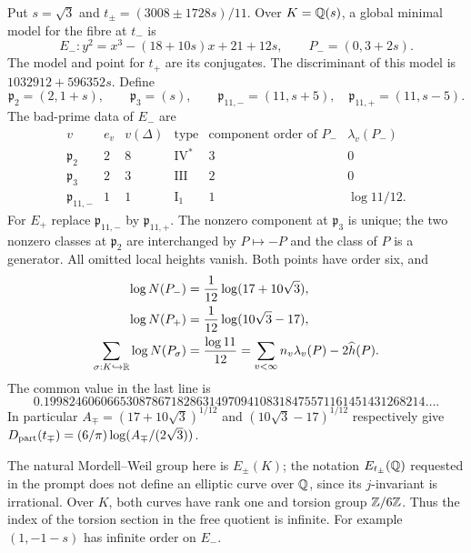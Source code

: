 \begin{statement}
Put $s=\sqrt3$ and
$t_\pm=(3008\pm1728s)/11$. Over $K=\mathbb Q(s)$, a global minimal
model for the fibre at $t_-$ is
\[
 E_-:y^2=x^3-(18+10s)x+21+12s,\qquad P_-=(0,3+2s).
\]
The model and point for $t_+$ are its conjugates. The
discriminant of this model is $1032912+596352s$. Define
\[
 \mathfrak p_2=(2,1+s),\qquad\mathfrak p_3=(s),\qquad
 \mathfrak p_{11,-}=(11,s+5),\quad
 \mathfrak p_{11,+}=(11,s-5).
\]
The bad-prime data of $E_-$ are
\[
\begin{array}{c|c|c|c|c|c}
v&e_v&v(\Delta)&\text{type}&\text{component order of }P_-&\lambda_v(P_-)\\\hline
\mathfrak p_2&2&8&\mathrm{IV}^*&3&0\\
\mathfrak p_3&2&3&\mathrm{III}&2&0\\
\mathfrak p_{11,-}&1&1&\mathrm I_1&1&\log11/12.
\end{array}
\]
For $E_+$ replace $\mathfrak p_{11,-}$ by
$\mathfrak p_{11,+}$. The nonzero component at
$\mathfrak p_3$ is unique; the two nonzero classes at
$\mathfrak p_2$ are interchanged by $P\mapsto-P$ and the
class of $P$ is a generator. All omitted local heights vanish.
Both points have order six, and
\begin{align*}
 \log N(P_-)&=\frac1{12}\log(17+10\sqrt3),\\
 \log N(P_+)&=\frac1{12}\log(10\sqrt3-17),\\
 \sum_{\sigma:K\hookrightarrow\mathbb R}\log N(P_\sigma)
 &=\frac{\log11}{12}
 =\sum_{v<\infty}n_v\lambda_v(P)-2\widehat h(P).
\end{align*}
The common value in the last line is
\[
 0.199824606066530878671828631497094108318475571161451431268214\ldots.
\]
In particular $A_\mp=(17+10\sqrt3)^{1/12}$ and
$(10\sqrt3-17)^{1/12}$ respectively give
$D_{\rm part}(t_\mp)=(6/\pi)\log(A_\mp/(2\sqrt3))$.

The natural Mordell--Weil group here is $E_\pm(K)$; the
notation $E_{t_\pm}(\mathbb Q)$ requested in the prompt does not
define an elliptic curve over $\mathbb Q$, since its $j$-invariant
is irrational. Over $K$, both curves have rank one and torsion
group $\mathbb Z/6\mathbb Z$. Thus the index of the torsion section in the
free quotient is infinite. For example $(1,-1-s)$ has infinite
order on $E_-$.
\end{statement}
